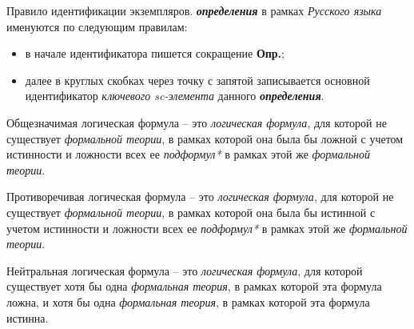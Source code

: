 Правило идентификации экземпляров. \textbf{\textit{определения}} в рамках \textit{Русского языка} именуются по следующим правилам:
\begin{itemize}
	\item{в начале идентификатора пишется сокращение \textbf{Опр.};}
	\item{далее в круглых скобках через точку с запятой записывается основной идентификатор  \textit{ключевого sc-элемента\scnrolesign} данного \textbf{\textit{определения}}.}
\end{itemize}


\begin{SCn}
\end{SCn}

Общезначимая логическая формула -- это \textit{логическая формула}, для которой не существует \textit{формальной теории}, в рамках которой она была бы ложной с учетом истинности и ложности всех ее \textit{подформул*} в рамках этой же \textit{формальной теории}.


\begin{SCn}
\end{SCn}

Противоречивая логическая формула -- это \textit{логическая формула}, для которой не существует \textit{формальной теории}, в рамках которой она была бы истинной с учетом истинности и ложности всех ее \textit{подформул*} в рамках этой же \textit{формальной теории}.


\begin{SCn}
\end{SCn}

Нейтральная логическая формула -- это \textit{логическая формула}, для которой существует хотя бы одна \textit{формальная теория}, в рамках которой эта формула ложна, и хотя бы одна \textit{формальная теория}, в рамках которой эта формула истинна.

